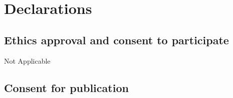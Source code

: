 \documentclass{bmcart}
\begin{document}


\section*{Declarations}

  \subsection*{Ethics approval and consent to participate}

    Not Applicable
    
  \subsection*{Consent for publication}
\end{document}
